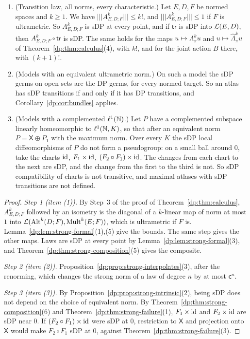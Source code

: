 \begin{proposition}\label{dp:prop:strong-bundle}
\leavevmode
\begin{enumerate}
\item \textup{(Transition law, all norms, every characteristic.)} Let $E,D,F$ be normed spaces and $k\ge1$. We have $\lvert\!\lvert\!\lvert A^k_{E,D;F}\rvert\!\rvert\!\rvert\le k!$, and $\lvert\!\lvert\!\lvert A^k_{E,D;F}\rvert\!\rvert\!\rvert\le1$ if $F$ is ultrametric. So $A^k_{E,D;F}$ is sDP at every point, and if $\mathsf{tr}$ is sDP into $\mathcal L(E,D)$, then $A^k_{E,D;F}\circ\mathsf{tr}$ is sDP. The same holds for the maps $u\mapsto\Lambda^k_\pi u$ and $u\mapsto\widehat\Lambda^k_\pi u$ of Theorem~\ref{dp:thm:calculus}(4), with $k!$, and for the joint action $B$ there, with $(k+1)!$.
\item \textup{(Models with an equivalent ultrametric norm.)} On such a model the sDP germs on open sets are the DP germs, for every normed target. So an atlas has sDP transitions if and only if it has DP transitions, and Corollary~\ref{dp:cor:bundles} applies.
\item \textup{(Models with a complemented $\ell^1(\mathbb N)$.)} Let $P$ have a complemented subspace linearly homeomorphic to $\ell^1(\mathbb N,K)$, so that after an equivalent norm $P=\mathsf X\oplus P_1$ with the maximum norm. Over every $K$ the sDP local diffeomorphisms of $P$ do not form a pseudogroup: on a small ball around $0$, take the charts $\mathrm{id}$, $F_1\times\mathrm{id}$, $(F_2\circ F_1)\times\mathrm{id}$. The changes from each chart to the next are sDP, and the change from the first to the third is not. So sDP compatibility of charts is not transitive, and maximal atlases with sDP transitions are not defined.
\end{enumerate}
\end{proposition}

\begin{proof}
\emph{Step 1 (item (1)).} By Step~3 of the proof of Theorem~\ref{dp:thm:calculus}, $A^k_{E,D;F}$ followed by an isometry is the diagonal of a $k$\nobreakdash-linear map of norm at most $1$ into $\mathcal L(\operatorname{Alt}^k(D;F),\operatorname{Mult}^k(E;F))$, which is ultrametric if $F$ is. Lemma~\ref{dp:lem:strong-formal}(1),(5) give the bounds. The same step gives the other maps. Laws are sDP at every point by Lemma~\ref{dp:lem:strong-formal}(3), and Theorem~\ref{dp:thm:strong-composition}(5) gives the composite.

\emph{Step 2 (item (2)).} Proposition~\ref{dp:prop:strong-interpolates}(3), after the renorming, which changes the strong norm of a law of degree $n$ by at most $\mathsf c^n$.

\emph{Step 3 (item (3)).} By Proposition~\ref{dp:prop:strong-intrinsic}(2), being sDP does not depend on the choice of equivalent norm. By Theorem~\ref{dp:thm:strong-composition}(6) and Theorem~\ref{dp:thm:strong-failure}(1), $F_1\times\mathrm{id}$ and $F_2\times\mathrm{id}$ are sDP near $0$. If $(F_2\circ F_1)\times\mathrm{id}$ were sDP at $0$, restriction to $\mathsf X$ and projection onto $\mathsf X$ would make $F_2\circ F_1$ sDP at $0$, against Theorem~\ref{dp:thm:strong-failure}(3).
\end{proof}

